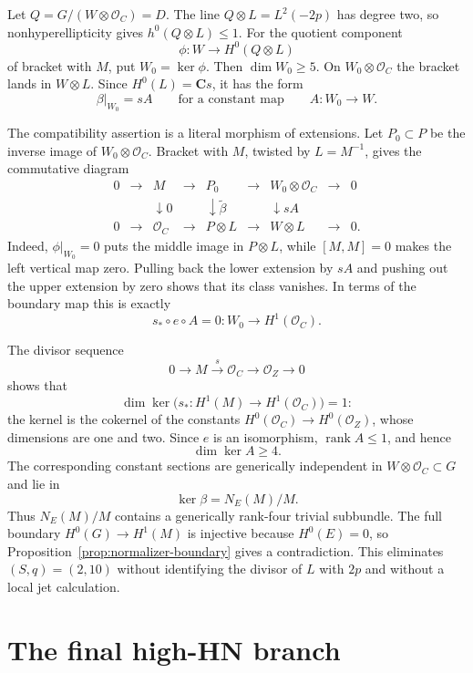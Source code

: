 \documentclass[11pt]{article}
\theoremstyle{definition}
\newcommand{\C}{\mathbf C}
\newcommand{\Ocal}{\mathcal O}
\begin{document}
Let $Q=G/(W\otimes\Ocal_C)=D$.  The line $Q\otimes L=L^2(-2p)$ has
degree two, so nonhyperellipticity gives $h^0(Q\otimes L)\le1$.  For the
quotient component
\[
 \phi:W\longrightarrow H^0(Q\otimes L)
\]
of bracket with $M$, put $W_0=\ker\phi$.  Then $\dim W_0\ge5$.
On $W_0\otimes\Ocal_C$ the bracket lands in
$W\otimes L$.  Since $H^0(L)=\C s$, it has the form
\[
 \beta|_{W_0}=sA
 \qquad\text{for a constant map}\qquad A:W_0\longrightarrow W.
\]

The compatibility assertion is a literal morphism of extensions.  Let
$P_0\subset P$ be the inverse image of $W_0\otimes\Ocal_C$.  Bracket with
$M$, twisted by $L=M^{-1}$, gives the commutative diagram
\[
\begin{array}{ccccccccc}
0&\longrightarrow&M&\longrightarrow&P_0&\longrightarrow
 &W_0\otimes\Ocal_C&\longrightarrow&0\\
&&\downarrow 0&&\downarrow\widetilde\beta&&\downarrow sA\\
0&\longrightarrow&\Ocal_C&\longrightarrow&P\otimes L&\longrightarrow
 &W\otimes L&\longrightarrow&0.
\end{array}
\]
Indeed, $\phi|_{W_0}=0$ puts the middle image in $P\otimes L$, while
$[M,M]=0$ makes the left vertical map zero.  Pulling back the lower
extension by $sA$ and pushing out the upper extension by zero shows that its
class vanishes.  In terms of the boundary map this is exactly
\[
 s_*\circ e\circ A=0:
 W_0\longrightarrow H^1(\Ocal_C).
\]

The divisor sequence
\[
0\longrightarrow M\xrightarrow{s}\Ocal_C
\longrightarrow\Ocal_Z\longrightarrow0
\]
shows that
\[
\dim\ker\bigl(s_*:H^1(M)\longrightarrow H^1(\Ocal_C)\bigr)=1:
\]
the kernel is the cokernel of the constants
$H^0(\Ocal_C)\to H^0(\Ocal_Z)$, whose dimensions are one and two.
Since $e$ is an isomorphism, $\operatorname{rank}A\le1$, and hence
\[
 \dim\ker A\ge4.
\]
The corresponding constant sections are generically independent in
$W\otimes\Ocal_C\subset G$ and lie in
\[
 \ker\beta=N_E(M)/M.
\]
Thus $N_E(M)/M$ contains a generically rank-four trivial subbundle.  The
full boundary $H^0(G)\to H^1(M)$ is injective because $H^0(E)=0$, so
Proposition~\ref{prop:normalizer-boundary} gives a contradiction.  This
eliminates $(S,q)=(2,10)$ without identifying the divisor of $L$ with $2p$
and without a local jet calculation.

\section{The final high-HN branch}\label{sec:high}
\end{document}
